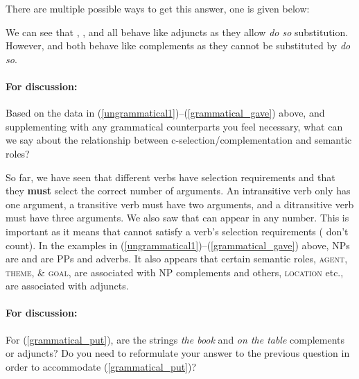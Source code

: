 \documentclass{article}
\begin{document}
\begin{answer}{
There are multiple possible ways to get this answer, one is given below:
\begin{exe}
\end{exe}
We can see that , , and  all behave like adjuncts as they allow \emph{do so} substitution.
However,  and  both behave like complements as they cannot be substituted by \emph{do so}.    }
\end{answer}

\paragraph{For discussion:} Based on the data in (\ref{ungrammatical1})--(\ref{grammatical_gave}) above, and supplementing with any grammatical counterparts you feel necessary, what can we say about the relationship between c-selection/complementation and semantic roles?

\begin{answer}
{
So far, we have seen that different verbs have selection requirements and that they \textbf{must} select the correct number of arguments.
An intransitive verb only has one argument, a transitive verb must have two arguments, and a ditransitive verb must have three arguments.
We also saw that  can appear in any number.
This is important as it means that cannot satisfy a verb's selection requirements ( don't count).
In the examples in (\ref{ungrammatical1})--(\ref{grammatical_gave}) above, NPs are  and  are PPs and adverbs.
It also appears that certain semantic roles, \textsc{agent}, \textsc{theme}, \& \textsc{goal}, are associated with NP complements and others, \textsc{location} etc., are associated with adjuncts. }
\end{answer}

\paragraph{For discussion:} For (\ref{grammatical_put}), are the strings \emph{the book} and \emph{on the table} complements or adjuncts? 
Do you need to reformulate your answer to the previous question in order to accommodate (\ref{grammatical_put})?
\begin{exe}
    \label{grammatical_put}
\end{exe}
\end{document}
